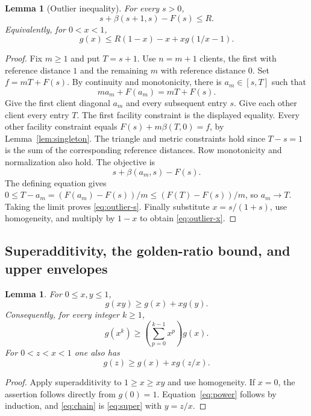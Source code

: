 \documentclass[11pt]{article}
\numberwithin{equation}{section}
\newtheorem{lemma}[theorem]{Lemma}
\theoremstyle{definition}
\begin{document}
\begin{lemma}[Outlier inequality]\label{lem:outlier}
For every $s>0$,
\begin{equation}\label{eq:outlier-s}
 s+\beta(s+1,s)-F(s)\le R.
\end{equation}
Equivalently, for $0<x<1$,
\begin{equation}\label{eq:outlier-x}
 g(x)\le R(1-x)-x+xg(1/x-1).
\end{equation}
\end{lemma}
\begin{proof}
Fix $m\ge1$ and put $T=s+1$. Use $n=m+1$ clients, the first with reference
distance $1$ and the remaining $m$ with reference distance $0$. Set
$f=mT+F(s)$. By continuity and monotonicity, there is $a_m\in[s,T]$ such that
\[
 ma_m+F(a_m)=mT+F(s).
\]
Give the first client diagonal $a_m$ and every subsequent entry $s$.
Give each other client every entry $T$. The first facility constraint is the
displayed equality. Every other facility constraint equals
$F(s)+m\beta(T,0)=f$, by Lemma~\ref{lem:singleton}.
The triangle and metric constraints hold since $T-s=1$ is the sum of the
corresponding reference distances. Row monotonicity and normalization also
hold. The objective is
\[
 s+\beta(a_m,s)-F(s).
\]
The defining equation gives
$0\le T-a_m=(F(a_m)-F(s))/m\le(F(T)-F(s))/m$, so $a_m\to T$.
Taking the limit proves \eqref{eq:outlier-s}.
Finally substitute $x=s/(1+s)$, use homogeneity, and multiply by $1-x$ to
obtain \eqref{eq:outlier-x}.
\end{proof}

\subsection{Superadditivity, the golden-ratio bound, and upper envelopes}

\begin{lemma}\label{lem:super}
For $0\le x,y\le1$,
\begin{equation}\label{eq:super}
 g(xy)\ge g(x)+xg(y).
\end{equation}
Consequently, for every integer $k\ge1$,
\begin{equation}\label{eq:power}
 g(x^k)\ge\left(\sum_{p=0}^{k-1}x^p\right)g(x).
\end{equation}
For $0<z<x<1$ one also has
\begin{equation}\label{eq:chain}
 g(z)\ge g(x)+xg(z/x).
\end{equation}
\end{lemma}
\begin{proof}
Apply superadditivity to $1\ge x\ge xy$ and use homogeneity.
If $x=0$, the assertion follows directly from $g(0)=1$.
Equation~\eqref{eq:power} follows by induction, and
\eqref{eq:chain} is \eqref{eq:super} with $y=z/x$.
\end{proof}
\end{document}
